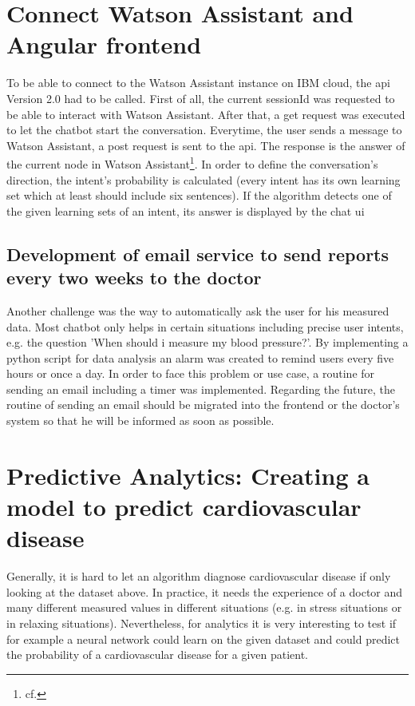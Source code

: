 \section{Connect Watson Assistant and Angular frontend}

To be able to connect to the Watson Assistant instance on IBM cloud, the \ac{api} Version 2.0 had to be called. First of all, the current sessionId was requested to be able to interact with Watson Assistant. After that, a get request was executed to let the chatbot start the conversation. Everytime, the user sends a message to Watson Assistant, a post request is sent to the \ac{api}. The response is the answer of the current node in Watson Assistant\footnote{cf.\autocite{wa_api_v2}}. In order to define the conversation's direction, the intent's probability is calculated (every intent has its own learning set which at least should include six sentences). If the algorithm detects one of the given learning sets of an intent, its answer is displayed by the chat \ac{ui}

\subsection{Development of email service to send reports every two weeks to the doctor}

Another challenge was the way to automatically ask the user for his measured data. Most chatbot only helps in certain situations including precise user intents, e.g. the question 'When should i measure my blood pressure?'. By implementing a python script for data analysis an alarm was created to remind users every five hours or once a day.
In order to face this problem or use case, a routine for sending an email including a timer was implemented. Regarding the future, the routine of sending an email should be migrated into the frontend or the doctor's system so that he will be informed as soon as possible. 

\section{Predictive Analytics: Creating a model to predict cardiovascular disease} \label{predict}
Generally, it is hard to let an algorithm diagnose cardiovascular disease if only looking at the dataset above. In practice, it needs the experience of a doctor and many different measured values in different situations (e.g. in stress situations or in relaxing situations). Nevertheless, for analytics it is very interesting to test if for example a neural network could learn on the given dataset and could predict the probability of a cardiovascular disease for a given patient. 

